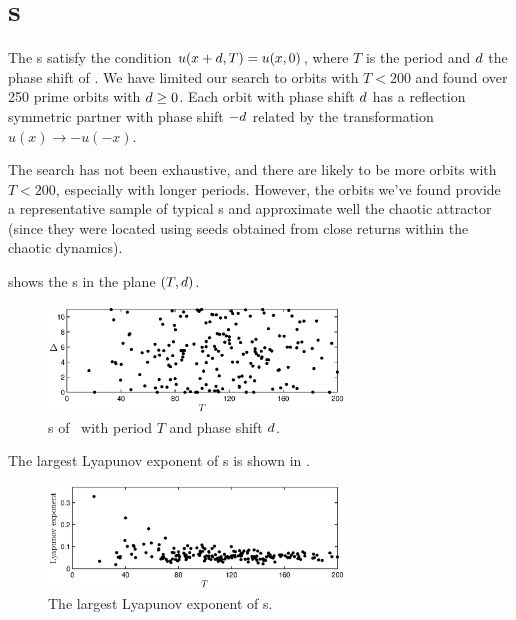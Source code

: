 %

\section{\Rpo s}

The \rpo s satisfy the condition $u(x+d,T) = u(x,0)$, where $T$
is the period and $d$ the phase shift of \rpo .  We have
limited our search to orbits with $T < 200$ and found over 250 prime
orbits with $d \ge 0$.  Each orbit with phase shift $d$
has a reflection symmetric partner with phase shift $-d$
related by the transformation $u(x) \to -u(-x)$.

The search has not been exhaustive, and there are likely to be more
orbits with $T < 200$, especially with longer periods.  However, the
orbits we've found provide a representative sample of typical \rpo s
and approximate well the chaotic attractor (since they were located
using seeds obtained from close returns within the chaotic
dynamics).

 shows the \rpo s in the plane $(T,d)$.
\begin{figure}[t]
\begin{center}
\includegraphics[width=0.7\textwidth]{figs/ks22_rpos_Tdelta.eps}
\end{center}
\caption{\Rpo s of \KSe\ with period $T$ and phase shift $d$.
        } \label{f:ks22rposT}
\end{figure}

The largest Lyapunov exponent of \rpo s is shown in
.

\begin{figure}[t]
\begin{center}
\includegraphics[width=0.7\textwidth]{figs/ks22_rpos_lyap.eps}
\end{center}
\caption{The largest Lyapunov exponent of \rpo s.
        } \label{f:ks22rposL}
\end{figure}

